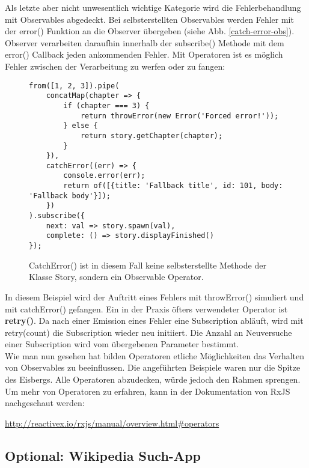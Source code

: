 \noindent
Als letzte aber nicht unwesentlich wichtige Kategorie wird die Fehlerbehandlung mit Observables abgedeckt. Bei selbsterstellten Observables werden Fehler mit der error() Funktion an die Observer übergeben (siehe Abb. \ref{catch-error-obs}). Observer verarbeiten daraufhin innerhalb der subscribe() Methode mit dem error() Callback jeden ankommenden Fehler. Mit Operatoren ist es möglich Fehler zwischen der Verarbeitung zu werfen oder zu fangen:

\begin{figure}[H]
\begin{lstlisting}[basicstyle=\small]
from([1, 2, 3]).pipe(
    concatMap(chapter => {
        if (chapter === 3) {
            return throwError(new Error('Forced error!'));
        } else {
            return story.getChapter(chapter);
        }
    }),
    catchError((err) => {
        console.error(err);
        return of([{title: 'Fallback title', id: 101, body: 'Fallback body'}]);
    })
).subscribe({
    next: val => story.spawn(val),
    complete: () => story.displayFinished()
});
\end{lstlisting}
\caption{CatchError() ist in diesem Fall keine selbsterstellte Methode der Klasse Story, sondern ein Observable Operator.}
\end{figure}

\noindent
In diesem Beispiel wird der Auftritt eines Fehlers mit throwError() simuliert und mit catchError() gefangen. Ein in der Praxis öfters verwendeter Operator ist \textbf{retry()}. Da nach einer Emission eines Fehler eine Subscription abläuft, wird mit retry(count) die Subscription wieder neu initiiert. Die Anzahl an Neuversuche einer Subscription wird vom übergebenen Parameter bestimmt.\\

\noindent
Wie man nun gesehen hat bilden Operatoren etliche Möglichkeiten das Verhalten von Observables zu beeinflussen. Die angeführten Beispiele waren nur die Spitze des Eisbergs. Alle Operatoren abzudecken, würde jedoch den Rahmen sprengen. Um mehr von Operatoren zu erfahren, kann in der Dokumentation von RxJS nachgeschaut werden:

\begin{center}
\url{http://reactivex.io/rxjs/manual/overview.html#operators} 
\end{center}

\subsection{Optional: Wikipedia Such-App}

